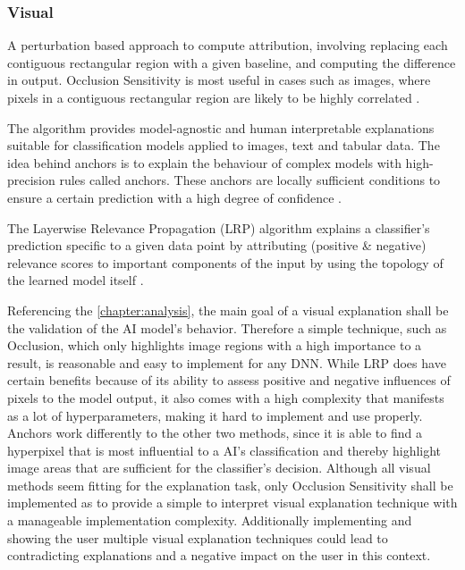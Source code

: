 \documentclass[11pt,a4paper,english]{scrreprt}
\begin{document}
\subsubsection*{Visual}
\begin{description}[font=\normalfont\itshape]
    \item[Occlusion Sensitivity:] A perturbation based approach to compute attribution, involving replacing each contiguous rectangular region with a given baseline, and computing the difference in output. Occlusion Sensitivity is most useful in cases such as images, where pixels in a contiguous rectangular region are likely to be highly correlated \parencite{captum_website,zeiler_visualizing_2013}.
    \item[Anchors:] The algorithm provides model-agnostic and human interpretable explanations suitable for classification models applied to images, text and tabular data. The idea behind anchors is to explain the behaviour of complex models with high-precision rules called anchors. These anchors are locally sufficient conditions to ensure a certain prediction with a high degree of confidence \parencite{ribeiro_anchors_2018}.
    \item[LRP:] The Layerwise Relevance Propagation (LRP) algorithm explains a classifier's prediction specific to a given data point by attributing (positive \& negative) relevance scores to important components of the input by using the topology of the learned model itself \parencite{lapuschkin_unmasking_2019}.
\end{description}
Referencing the \autoref{chapter:analysis}, the main goal of a visual explanation shall be the validation of the AI model's behavior. Therefore a simple technique, such as Occlusion, which only highlights image regions with a high importance to a result, is reasonable and easy to implement for any DNN. While LRP does have certain benefits because of its ability to assess positive and negative influences of pixels to the model output, it also comes with a high complexity that manifests as a lot of hyperparameters, making it hard to implement and use properly. Anchors work differently to the other two methods, since it is able to find a hyperpixel that is most influential to a AI's classification and thereby highlight image areas that are sufficient for the classifier's decision. Although all visual methods seem fitting for the explanation task, only Occlusion Sensitivity shall be implemented as to provide a simple to interpret visual explanation technique with a manageable implementation complexity. Additionally implementing and showing the user multiple visual explanation techniques could lead to contradicting explanations and a negative impact on the user in this context.
\end{document}
